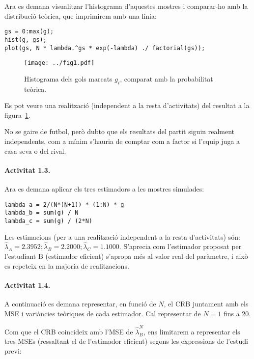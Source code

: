 \documentclass[catalan]{scrartcl}
\begin{document}
Ara es demana visualitzar l'histograma d'aquestes mostres i comparar-ho amb
la distribució teòrica, que imprimirem amb una línia:

\begin{verbatim}
gs = 0:max(g);
hist(g, gs);
plot(gs, N * lambda.^gs * exp(-lambda) ./ factorial(gs));
\end{verbatim}

\begin{figure}
\center
\texttt{[image: ../fig1.pdf]}
\caption{Histograma dels gols marcats $g_i$, comparat amb la probabilitat teòrica. \label{fig:fig1}}
\end{figure}

Es pot veure una realització (independent a la resta d'activitats) del resultat a la figura~\ref{fig:fig1}.

No se gaire de futbol, però dubto que els resultats del partit siguin realment
independents, com a mínim s'hauria de comptar com a factor si l'equip juga a
casa seva o del rival.

\paragraph{Activitat 1.3.}

Ara es demana aplicar els tres estimadors a les mostres simulades:

\begin{verbatim}
lambda_a = 2/(N*(N+1)) * (1:N) * g
lambda_b = sum(g) / N
lambda_c = sum(g) / (2*N)
\end{verbatim}

Les estimacions (per a una realització independent a la resta d'activitats) són:\\
$\hat{\lambda}_A = 2.3952; \hat{\lambda}_B = 2.2000; \hat{\lambda}_C = 1.1000$.
S'aprecia com l'estimador proposat per l'estudiant B (estimador eficient) s'apropa més al
valor real del paràmetre, i això es repeteix en la majoria de realitzacions.

\paragraph{Activitat 1.4.}

A continuació es demana representar, en funció de $N$, el CRB juntament amb
els MSE i variàncies teòriques de cada estimador. Cal representar de $N = 1$ fins
a $20$.

Com que el CRB coincideix amb l'MSE
de $\hat{\lambda}_B^N$, ens limitarem a representar els tres MSEs (ressaltant
el de l'estimador eficient) segons les expressions de l'estudi previ:
\end{document}
